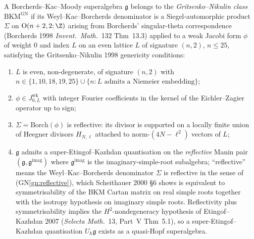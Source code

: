 \begin{definition}
\label{def:bkm-gn-class}
A Borcherds--Kac--Moody superalgebra $\mathfrak{g}$ belongs to the \emph{Gritsenko--Nikulin class} $\mathrm{BKM}^{\mathrm{GN}}$ if its Weyl--Kac--Borcherds denominator is a Siegel-automorphic product $\Sigma$ on $\mathrm{O}(n+2, 2; \Z)$ arising from Borcherds' singular-theta correspondence (Borcherds 1998 \emph{Invent.\ Math.}~132 Thm~13.3) applied to a weak Jacobi form $\phi$ of weight $0$ and index $L$ on an even lattice $L$ of signature $(n, 2)$, $n \leq 25$, satisfying the Gritsenko--Nikulin 1998 genericity conditions:
\begin{enumerate}[label=\textup{(GN\arabic*)}]
 \item \label{gn:lattice} $L$ is even, non-degenerate, of signature $(n, 2)$ with $n \in \{1, 10, 18, 19, 25\} \cup \{n : L \text{ admits a Niemeier embedding}\}$;
 \item \label{gn:jacobi} $\phi \in J^{\mathrm{wk}}_{0, L}$ with integer Fourier coefficients in the kernel of the Eichler--Zagier operator up to sign;
 \item \label{gn:reflective} $\Sigma = \mathrm{Borch}(\phi)$ is reflective: its divisor is supported on a locally finite union of Heegner divisors $H_{N,\ell}$ attached to norm-$(4N - \ell^2)$ vectors of $L$;
 \item \label{gn:super-ek} $\mathfrak{g}$ admits a super-Etingof--Kazhdan quantisation on the \emph{reflective} Manin pair $(\mathfrak{g}, \mathfrak{g}^{\mathrm{imag}})$ where $\mathfrak{g}^{\mathrm{imag}}$ is the imaginary-simple-root subalgebra; ``reflective'' means the Weyl--Kac--Borcherds denominator $\Sigma$ is reflective in the sense of (GN\ref{gn:reflective}), which Scheithauer 2000 \S6 shows is equivalent to symmetrisability of the BKM Cartan matrix on real simple roots together with the isotropy hypothesis on imaginary simple roots. Reflectivity plus symmetrisability implies the $H^2$-nondegeneracy hypothesis of Etingof--Kazhdan 2007 (\emph{Selecta Math.}~13, Part~V Thm~5.1), so a super-Etingof--Kazhdan quantisation $U_\hbar \mathfrak{g}$ exists as a quasi-Hopf superalgebra.
\end{enumerate}
\end{definition}

